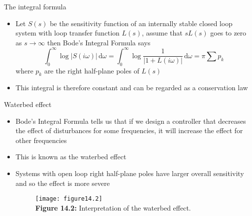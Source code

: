 \documentclass{beamer-control}
\begin{document}
\begin{frame}{The integral formula}
	\begin{itemize}
		\item Let $S(s)$ be the sensitivity function of an internally stable closed loop system with loop transfer function $L(s)$, assume that $sL(s)$ goes to zero as $s\rightarrow \infty$ then Bode's Integral Formula says
		\[\int^\infty_0 \log |S(i\omega)|\, \mathrm{d}\omega  = \int^\infty_0 \log \frac{1}{|1+L(i\omega)|}\, \mathrm{d}\omega = \pi \sum p_k\]
		where $p_k$ are the right half-plane poles of $L(s)$
		\item This integral is therefore constant and can be regarded as a conservation law
	\end{itemize}
\end{frame}


\begin{frame}{Waterbed effect}
	\begin{itemize}
		\item Bode's Integral Formula tells us that if we design a controller that decreases the effect of disturbances for some frequencies, it will increase the effect for other frequencies
		\item This is known as the waterbed effect
		\item Systems with open loop right half-plane poles have larger overall sensitivity and so the effect is more severe
		\begin{figure}
			\centering
			\texttt{[image: figure14.2]}\\
			\vspace{-0.2cm}
			\textbf{Figure 14.2:} Interpretation of the waterbed effect.
		\end{figure}
	\end{itemize}
\end{frame}


\SUMMARYFRAME
\FINALE
\end{document}
